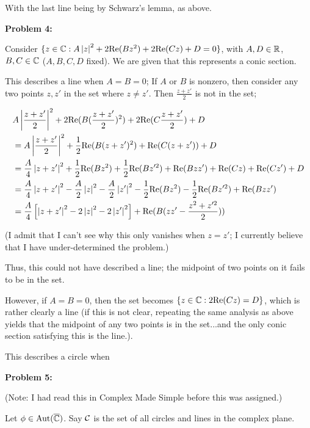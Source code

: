 \documentclass[a4paper,12pt]{article}
\begin{document}
With the last line being by Schwarz's lemma, as above.

\shunt

{\bf Problem 4:}

Consider $\{z \in \mathbb{C}: A \left\lvert z \right\rvert^2 + 2\text{Re}(Bz^2) + 2\text{Re}(Cz) + D = 0\}$, with $A,D \in \mathbb{R}$, $B,C \in \mathbb{C}$ ($A,B,C,D$ fixed). We are given that this represents a conic section.

This describes a line when $A=B=0$; If $A$ or $B$ is nonzero, then consider any two points $z,z'$ in the set where $z \neq z'$. Then $\frac{z+z'}{2}$ is not in the set;

\begin{align*}
&A \left\lvert \frac{z+z'}{2} \right\rvert^2 + 2\text{Re}(B(\frac{z+z'}{2})^2) + 2\text{Re}(C\frac{z+z'}{2}) + D\\
&= A \left\lvert \frac{z+z'}{2} \right\rvert^2 + \frac{1}{2}\text{Re}(B(z+z')^2) + \text{Re}(C(z+z')) + D\\
&= \frac{A}{4} \left\lvert z+z' \right\rvert^2 + \frac{1}{2}\text{Re}(Bz^2)+ \frac{1}{2}\text{Re}(Bz'^2) + \text{Re}(Bzz') + \text{Re}(Cz) +\text{Re}(Cz')+ D\\
&= \frac{A}{4} \left\lvert z+z' \right\rvert^2 -\frac{A}{2}\left\lvert z \right\rvert^2 -\frac{A}{2}\left\lvert z' \right\rvert^2- \frac{1}{2}\text{Re}(Bz^2)- \frac{1}{2}\text{Re}(Bz'^2) + \text{Re}(Bzz')\\
&= \frac{A}{4} \left[\left\lvert z+z' \right\rvert^2 -2\left\lvert z \right\rvert^2 -2\left\lvert z' \right\rvert^2\right] + \text{Re}(B(zz'-\frac{z^2+z'^2}{2}))\\
\end{align*}

(I admit that I can't see why this only vanishes when $z=z'$; I currently believe that I have under-determined the problem.) %

Thus, this could not have described a line; the midpoint of two points on it fails to be in the set.

However, if $A=B=0$, then the set becomes $\{z \in \mathbb{C}: 2\text{Re}(Cz) = D\}$, which is rather clearly a line (if this is not clear, repeating the same analysis as above yields that the midpoint of any two points is in the set...and the only conic section satisfying this is the line.).

This describes a circle when %

\shunt

{\bf Problem 5:}

(Note: I had read this in Complex Made Simple before this was assigned.)

Let $\phi \in \text{Aut}(\overline{\mathbb{C}})$. Say $\mathcal{C}$ is the set of all circles and lines in the complex plane.
\end{document}
